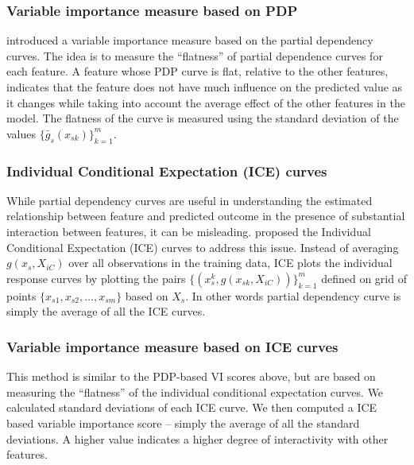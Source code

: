 \documentclass[11pt,a4paper,]{article}
\begin{document}
\subsubsection{Variable importance measure based on
PDP}\label{variable-importance-measure-based-on-pdp}

\textcite{Greenwell2018} introduced a variable importance measure based
on the partial dependency curves. The idea is to measure the
``flatness'' of partial dependence curves for each feature. A feature
whose PDP curve is flat, relative to the other features, indicates that
the feature does not have much influence on the predicted value as it
changes while taking into account the average effect of the other
features in the model. The flatness of the curve is measured using the
standard deviation of the values \(\{\bar{g}_{s}(x_{sk})\}_{k=1}^{m}\).

\subsubsection{Individual Conditional Expectation (ICE)
curves}\label{individual-conditional-expectation-ice-curves}

While partial dependency curves are useful in understanding the
estimated relationship between feature and predicted outcome in the
presence of substantial interaction between features, it can be
misleading. \textcite{goldstein2015peeking} proposed the Individual
Conditional Expectation (ICE) curves to address this issue. Instead of
averaging \(g(x_s, X_{iC})\) over all observations in the training data,
ICE plots the individual response curves by plotting the pairs
\(\{(x_s^k, g(x_{sk}, X_{iC}))\}_{k=1}^{m}\) defined on grid of points
\(\{x_{s1}, x_{s2},\dots, x_{sm}\}\) based on \(X_s\). In other words
partial dependency curve is simply the average of all the ICE curves.

\subsubsection{Variable importance measure based on ICE
curves}\label{variable-importance-measure-based-on-ice-curves}

This method is similar to the PDP-based VI scores above, but are based
on measuring the ``flatness'' of the individual conditional expectation
curves. We calculated standard deviations of each ICE curve. We then
computed a ICE based variable importance score -- simply the average of
all the standard deviations. A higher value indicates a higher degree of
interactivity with other features.
\end{document}
